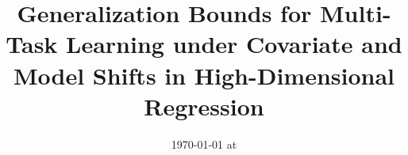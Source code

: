 \documentclass{article}
\begin{document}
\title{Generalization Bounds for Multi-Task Learning under Covariate and Model Shifts in High-Dimensional Regression}
\date{}
\maketitle
\date{{\ddmmyyyydate\today} at \currenttime}






	
	
\end{document}
